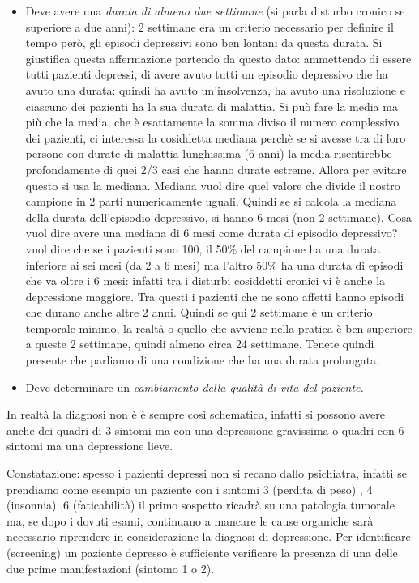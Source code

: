 \begin{itemize}
\item
  Deve avere una \emph{\emph{durata di almeno due settimane}} (si parla
  disturbo cronico se superiore a due anni): 2 settimane era un criterio
  necessario per definire il tempo però, gli episodi depressivi sono ben
  lontani da questa durata. Si giustifica questa affermazione partendo
  da questo dato: ammettendo di essere tutti pazienti depressi, di avere
  avuto tutti un episodio depressivo che ha avuto una durata: quindi ha
  avuto un'insolvenza, ha avuto una risoluzione e ciascuno dei pazienti
  ha la sua durata di malattia. Si può fare la media ma più che la
  media, che è esattamente la somma diviso il numero complessivo dei
  pazienti, ci interessa la cosiddetta mediana perchè se si avesse tra
  di loro persone con durate di malattia lunghissima (6 anni) la media
  risentirebbe profondamente di quei 2/3 casi che hanno durate estreme.
  Allora per evitare questo si usa la mediana. Mediana vuol dire quel
  valore che divide il nostro campione in 2 parti numericamente uguali.
  Quindi se si calcola la mediana della durata dell'episodio depressivo,
  si hanno 6 mesi (non 2 settimane). Cosa vuol dire avere una mediana di
  6 mesi come durata di episodio depressivo? vuol dire che se i pazienti
  sono 100, il 50\% del campione ha una durata inferiore ai sei mesi (da
  2 a 6 mesi) ma l'altro 50\% ha una durata di episodi che va oltre i 6
  mesi: infatti tra i disturbi cosiddetti cronici vi è anche la
  depressione maggiore. Tra questi i pazienti che ne sono affetti hanno
  episodi che durano anche altre 2 anni. Quindi se qui 2 settimane è un
  criterio temporale minimo, la realtà o quello che avviene nella
  pratica è ben superiore a queste 2 settimane, quindi almeno circa 24
  settimane. Tenete quindi presente che parliamo di una condizione che
  ha una durata prolungata.
\item
  Deve determinare un \emph{\emph{cambiamento della qualità di vita del
  paziente.}}
\end{itemize}

In realtà la diagnosi non è è sempre così schematica, infatti si possono
avere anche dei quadri di 3 sintomi ma con una depressione gravissima o
quadri con 6 sintomi ma una depressione lieve.

Constatazione: spesso i pazienti depressi non si recano dallo
psichiatra, infatti se prendiamo come esempio un paziente con i sintomi
3 (perdita di peso) , 4 (insonnia) ,6 (faticabilità) il primo sospetto
ricadrà su una patologia tumorale ma, se dopo i dovuti esami, continuano
a mancare le cause organiche sarà necessario riprendere in
considerazione la diagnosi di depressione. Per identificare (screening)
un paziente depresso è sufficiente verificare la presenza di una delle
due prime manifestazioni (sintomo 1 o 2).

